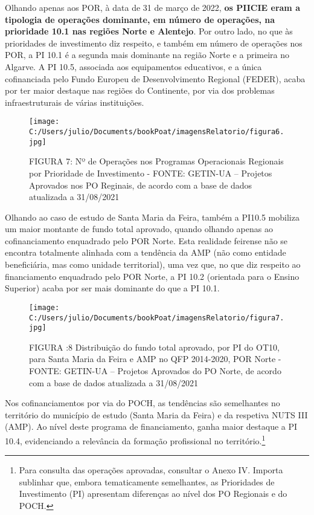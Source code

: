 \documentclass[
]{book}
\begin{document}
Olhando apenas aos POR, à data de 31 de março de 2022, \textbf{os PIICIE eram a tipologia de operações dominante, em número de operações, na prioridade 10.1 nas regiões Norte e Alentejo}. Por outro lado, no que às prioridades de investimento diz respeito, e também em número de operações nos POR, a PI 10.1 é a segunda mais dominante na região Norte e a primeira no Algarve. A PI 10.5, associada aos equipamentos educativos, e a única cofinanciada pelo Fundo Europeu de Desenvolvimento Regional (FEDER), acaba por ter maior destaque nas regiões do Continente, por via dos problemas infraestruturais de várias instituições.

\begin{figure}
\centering
\texttt{[image: C:/Users/julio/Documents/bookPoat/imagensRelatorio/figura6.jpg]}
\caption{FIGURA 7: Nº de Operações nos Programas Operacionais Regionais por Prioridade de Investimento - FONTE: GETIN-UA -- Projetos Aprovados nos PO Reginais, de acordo com a base de dados atualizada a 31/08/2021}
\end{figure}

Olhando ao caso de estudo de Santa Maria da Feira, também a PI10.5 mobiliza um maior montante de fundo total aprovado, quando olhando apenas ao cofinanciamento enquadrado pelo POR Norte. Esta realidade feirense não se encontra totalmente alinhada com a tendência da AMP (não como entidade beneficiária, mas como unidade territorial), uma vez que, no que diz respeito ao financiamento enquadrado pelo POR Norte, a PI 10.2 (orientada para o Ensino Superior) acaba por ser mais dominante do que a PI 10.1.

\begin{figure}
\centering
\texttt{[image: C:/Users/julio/Documents/bookPoat/imagensRelatorio/figura7.jpg]}
\caption{FIGURA :8 Distribuição do fundo total aprovado, por PI do OT10, para Santa Maria da Feira e AMP no QFP 2014-2020, POR Norte - FONTE: GETIN-UA -- Projetos Aprovados do PO Norte, de acordo com a base de dados atualizada a 31/08/2021}
\end{figure}

Nos cofinanciamentos por via do POCH, as tendências são semelhantes no território do município de estudo (Santa Maria da Feira) e da respetiva NUTS III (AMP). Ao nível deste programa de financiamento, ganha maior destaque a PI 10.4, evidenciando a relevância da formação profissional no território.\footnote{Para consulta das operações aprovadas, consultar o Anexo IV.
  Importa sublinhar que, embora tematicamente semelhantes, as Prioridades de Investimento (PI) apresentam diferenças ao nível dos PO Regionais e do POCH.}
\end{document}
